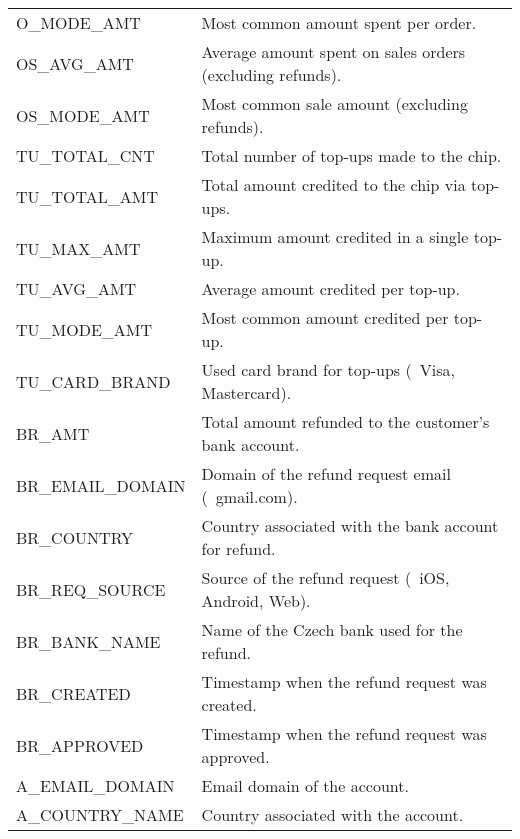 \begin{table}[h]
\begin{tabularx}{\textwidth}{|>{\columncolor{unicorn_blue!5}}X|>{\columncolor{unicorn_blue!5}}l|}
		O\_MODE\_AMT                         & Most common amount spent per order.                          \\
		OS\_AVG\_AMT                         & Average amount spent on sales orders (excluding refunds).    \\
		OS\_MODE\_AMT                        & Most common sale amount (excluding refunds).                 \\
		TU\_TOTAL\_CNT                       & Total number of top-ups made to the chip.                    \\
		TU\_TOTAL\_AMT                       & Total amount credited to the chip via top-ups.               \\
		TU\_MAX\_AMT                         & Maximum amount credited in a single top-up.                  \\
		TU\_AVG\_AMT                         & Average amount credited per top-up.                          \\
		TU\_MODE\_AMT                        & Most common amount credited per top-up.                      \\
		TU\_CARD\_BRAND                      & Used card brand for top-ups (\eg~Visa, Mastercard).          \\
		\hline
		BR\_AMT                              & Total amount refunded to the customer's bank account.        \\
		BR\_EMAIL\_DOMAIN                    & Domain of the refund request email (\eg~gmail.com).          \\
		BR\_COUNTRY                          & Country associated with the bank account for refund.         \\
		BR\_REQ\_SOURCE                      & Source of the refund request (\eg~iOS, Android, Web).        \\
		BR\_BANK\_NAME                       & Name of the Czech bank used for the refund.                  \\
		BR\_CREATED                          & Timestamp when the refund request was created.               \\
		BR\_APPROVED                         & Timestamp when the refund request was approved.              \\
		\hline
		A\_EMAIL\_DOMAIN                     & Email domain of the account.                                 \\
		A\_COUNTRY\_NAME                     & Country associated with the account.                         \\

\end{tabularx}
\end{table}
